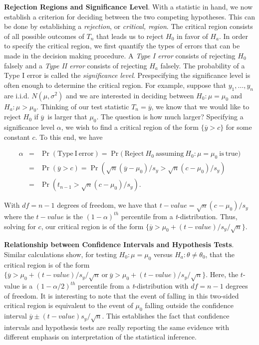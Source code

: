 \textbf{Rejection Regions and Significance Level}. With a statistic
in hand, we now establish a criterion for deciding between the two
competing hypotheses. This can be done by establishing a
\emph{rejection}, or \emph{critical, region}. The critical region
consists of all possible outcomes of $ T_n$ that leads us to reject
$H_0$ in favor of $H_{a}$. In order to specify the critical region,
we first quantify the types of errors that can be made in the
decision making procedure. A \emph{Type I error} consists of
rejecting $H_0$ falsely and a \emph{Type II error} consists of
rejecting $H_{a}$ falsely. The probability of a Type I error is
called the \emph{significance level}. Prespecifying the significance
level is often enough to determine the critical region. For example,
suppose that $y_1,\ldots,y_n$ are i.i.d. $N(\mu ,\sigma ^2)$ and we
are interested in deciding between $ H_0:\mu =\mu_0$ and $H_{a}:\mu
>\mu_0$. Thinking of our test statistic $T_n=\overline{y}$, we
know that we would like to reject $H_0$ if $\overline{y}$\ is larger
that $\mu_0$. The question is how much larger? Specifying a
significance level $\alpha $, we wish to find a critical region of
the form $\{\overline{y}>c\}$ for some constant $c$. To this end, we
have

\begin{eqnarray*}
\alpha  &\mathrm{=}&\Pr \mathrm{(Type~I~error)=}\Pr \mathrm{(}\
\mathrm{Reject~}H_0\mathrm{~assuming~} H_0:\mu =\mu_0
\mathrm{~is~true)} \\
&=&\Pr (\overline{y}>c)=\Pr (\sqrt{n}\left( \overline{y}-\mu
_0\right)
/s_y>\sqrt{n}\left( c-\mu_0 \right) /s_y) \\
&=&\Pr (t_{n-1}>\sqrt{n}\left( c-\mu_0 \right) /s_y).
\end{eqnarray*}

With $df=n-1$ degrees of freedom, we have that $t-value = \sqrt{n}
\left( c-\mu_0\right) /s_y$ where the $t-value$ is the
$(1-\alpha)^{th}$ percentile from a \textit{t}-distribution. Thus,
solving for $c$, our critical region is of the form $\{\overline{y}
> \mu_0 + (t-value)/s_y/\sqrt{n}\}$.

\textbf{Relationship between Confidence Intervals and Hypothesis
Tests}. Similar calculations show, for testing $H_0:\mu = \mu_0$
versus $H_{a}:\theta \neq \theta_0$, that the critical region is of
the form $\{ \overline{y} > \mu_0 + (t-value)/s_y/\sqrt{n} ~
\mathrm{or~}\overline{y} > \mu _0 + (t-value)/s_y/\sqrt{n}\}$. Here,
the $t$-value is a $(1-\alpha /2)^{th}$ percentile from a
\textit{t}-distribution with $df=n-1$ degrees of freedom. It is
interesting to note that the event of falling in this two-sided
critical region is equivalent to the event of $\mu_0$ falling
outside the confidence interval $\overline{y}\pm
(t-value)s_y/\sqrt{n}$. This establishes the fact that confidence
intervals and hypothesis tests are really reporting the same
evidence with different emphasis on interpretation of the
statistical inference.

